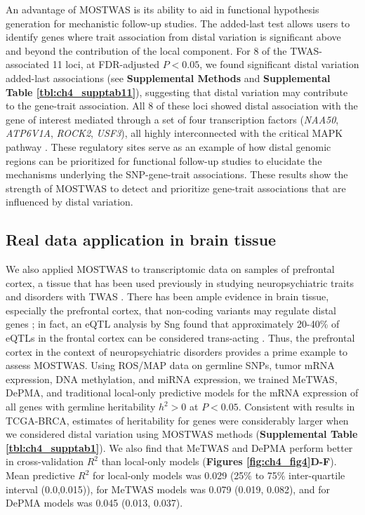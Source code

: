 An advantage of MOSTWAS is its ability
to aid in functional hypothesis generation
for mechanistic follow-up studies.
The added-last test allows users to
identify genes where trait association
from distal variation is significant above and beyond the
contribution of the local component.
For 8 of the TWAS-associated 11 loci, at
FDR-adjusted $P < 0.05$,
we found significant distal variation added-last
associations (see \textbf{Supplemental Methods}
and \textbf{Supplemental Table \ref{tbl:ch4_supptab11}}), 
suggesting that
distal variation may contribute to the gene-trait
association. All 8 of these loci
showed distal association with
the gene of interest mediated through
a set of four transcription factors 
(\textit{NAA50}, \textit{ATP6V1A}, 
\textit{ROCK2}, \textit{USF3}),
all highly interconnected with the critical MAPK
pathway 
\cite{Dorfel2015TheDisease,Lambertz2015BiologyTreatment,Whitton2018VacuolarCancer,Matsubara2016InhibitorsContext,Chang2018ROCKCells,NiGermlineCarcinoma}. 
These regulatory sites 
serve as an example
of how distal genomic regions 
can be prioritized for
functional follow-up studies to elucidate
the mechanisms underlying the SNP-gene-trait
associations.
These results show the
strength of MOSTWAS to detect and prioritize 
gene-trait
associations that are influenced
by distal variation.

\subsection{Real data application in brain tissue}

We also applied MOSTWAS to transcriptomic data 
on samples of prefrontal cortex,
a tissue that has been used previously
in studying neuropsychiatric traits and disorders
with TWAS \cite{Gusev2018,Raj2018IntegrativeSusceptibility}.
There has been ample evidence in brain tissue, especially the prefrontal
cortex, that non-coding variants
may regulate distal genes \cite{Blauwendraat2016ComprehensiveLobe,Gusev2018,Sey2020AProfiles}; 
in fact, an eQTL analysis
by Sng \etal{} found that approximately
20-40\% of eQTLs in the frontal cortex
can be considered trans-acting \cite{Sng2019Genome-wideDataset}. 
Thus,
the prefrontal cortex in the
context of neuropsychiatric disorders provides a prime
example to assess MOSTWAS.
Using ROS/MAP data on germline SNPs,
tumor mRNA expression, DNA methylation, and miRNA
expression, we trained MeTWAS,
DePMA, and traditional local-only predictive models 
for the mRNA expression of all genes
with germline heritability $h^2 > 0$
at $P < 0.05$. Consistent with results
in TCGA-BRCA, estimates of heritability
for genes were considerably larger
when we considered distal variation
using MOSTWAS methods (\textbf{Supplemental Table \ref{tbl:ch4_supptab1}}).
We also find that MeTWAS and DePMA
perform better in cross-validation
$R^2$ than local-only models (\textbf{Figures 
\ref{fig:ch4_fig4}D-F}).
Mean predictive $R^2$
for local-only models was
0.029 (25\% to 75\% inter-quartile
interval (0.0,0.015)), for
MeTWAS models was
0.079 (0.019, 0.082),
and for DePMA models was
0.045 (0.013, 0.037).

